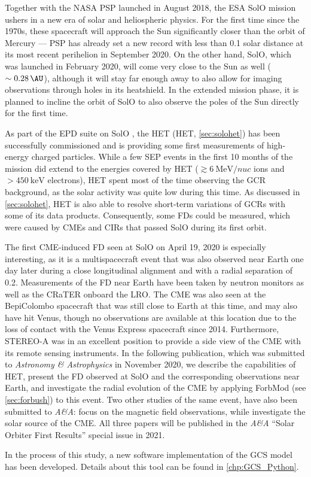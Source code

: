 Together with the NASA \ac{PSP} launched in August 2018, the ESA \ac{SolO} mission ushers in a new era of solar and heliospheric physics. For the first time since the 1970s, these spacecraft will approach the Sun significantly closer than the orbit of Mercury --- \ac{PSP} has already set a new record with less than \SI{0.1}{\AU} solar distance at its most recent perihelion in September 2020. On the other hand, \ac{SolO}, which was launched in February 2020, will come very close to the Sun as well ($\sim\SI{0.28}{\AU}$), although it will stay far enough away to also allow for imaging observations through holes in its heatshield. In the extended mission phase, it is planned to incline the orbit of \ac{SolO} to also observe the poles of the Sun directly for the first time.

As part of the \ac{EPD} suite on \ac{SolO} \citep{RodriguezPacheco-2019-EPD}, the \acl{HET} (\acs{HET}, \autoref{sec:solohet}) has been successfully commissioned and is providing some first measurements of high-energy charged particles. While a few \ac{SEP} events in the first 10 months of the mission did extend to the energies covered by \ac{HET} ($\gtrsim\SI{6}{\mega\electronvolt\per nuc}$ ions and $>\SI{450}{\kilo\electronvolt}$ electrons), \ac{HET} spent most of the time observing the \ac{GCR} background, as the solar activity was quite low during this time. As discussed in \autoref{sec:solohet}, \ac{HET} is also able to resolve short-term variations of \acp{GCR} with some of its data products. Consequently, some \acp{FD} could be measured, which were caused by \acp{CME} and \acp{CIR} that passed \ac{SolO} during its first orbit.

The first \ac{CME}-induced \ac{FD} seen at \ac{SolO} on April 19, 2020 is especially interesting, as it is a multispacecraft event that was also observed near Earth one day later during a close longitudinal alignment and with a radial separation of \SI{0.2}{\AU}. Measurements of the \ac{FD} near Earth have been taken by neutron monitors as well as the \ac{CRaTER} onboard the \ac{LRO}. The \ac{CME} was also seen at the BepiColombo spacecraft that was still close to Earth at this time, and may also have hit Venus, though no observations are available at this location due to the loss of contact with the Venus Express spacecraft since 2014. Furthermore, \acs{STEREO}-A was in an excellent position to provide a side view of the \ac{CME} with its remote sensing instruments. In the following publication, which was submitted to \textit{Astronomy \& Astrophysics} in November 2020, we describe the capabilities of \ac{HET}, present the \ac{FD} observed at \ac{SolO} and the corresponding observations near Earth, and investigate the radial evolution of the \ac{CME} by applying \acs{ForbMod} (see \autoref{sec:forbush}) to this event. Two other studies of the same event, have also been submitted to \textit{A\&A}: \textcite{Davies-2021} focus on the magnetic field observations, while \textcite{OKane-2021-SolO} investigate the solar source of the CME. All three papers will be published in the \textit{A\&A} ``Solar Orbiter First Results'' special issue in 2021.

In the process of this study, a new software implementation of the \ac{GCS} model \citep{Thernisien-2011-GCS} has been developed. Details about this tool can be found in \autoref{chp:GCS_Python}.

